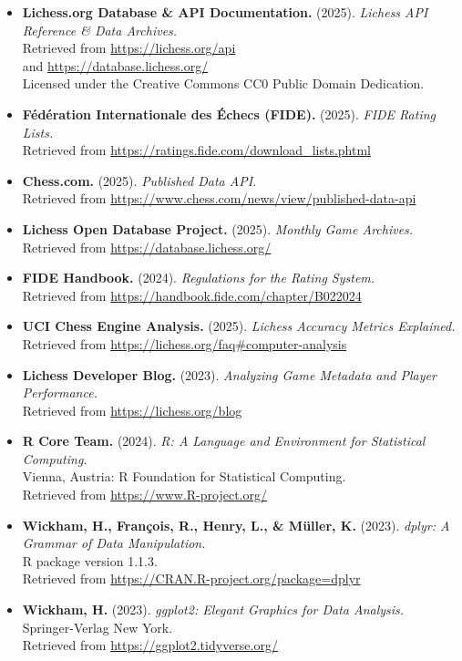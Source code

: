 \documentclass[
]{article}
\begin{document}
\begin{itemize}
\item
  \textbf{Lichess.org Database \& API Documentation.} (2025).
  \emph{Lichess API Reference \& Data Archives.}\\
  Retrieved from \url{https://lichess.org/api}\\
  and \url{https://database.lichess.org/}\\
  Licensed under the Creative Commons CC0 Public Domain Dedication.
\item
  \textbf{Fédération Internationale des Échecs (FIDE).} (2025).
  \emph{FIDE Rating Lists.}\\
  Retrieved from \url{https://ratings.fide.com/download_lists.phtml}
\item
  \textbf{Chess.com.} (2025). \emph{Published Data API.}\\
  Retrieved from
  \url{https://www.chess.com/news/view/published-data-api}
\item
  \textbf{Lichess Open Database Project.} (2025). \emph{Monthly Game
  Archives.}\\
  Retrieved from \url{https://database.lichess.org/}
\item
  \textbf{FIDE Handbook.} (2024). \emph{Regulations for the Rating
  System.}\\
  Retrieved from \url{https://handbook.fide.com/chapter/B022024}
\item
  \textbf{UCI Chess Engine Analysis.} (2025). \emph{Lichess Accuracy
  Metrics Explained.}\\
  Retrieved from \url{https://lichess.org/faq\#computer-analysis}
\item
  \textbf{Lichess Developer Blog.} (2023). \emph{Analyzing Game Metadata
  and Player Performance.}\\
  Retrieved from \url{https://lichess.org/blog}
\item
  \textbf{R Core Team.} (2024). \emph{R: A Language and Environment for
  Statistical Computing.}\\
  Vienna, Austria: R Foundation for Statistical Computing.\\
  Retrieved from \url{https://www.R-project.org/}
\item
  \textbf{Wickham, H., François, R., Henry, L., \& Müller, K.} (2023).
  \emph{dplyr: A Grammar of Data Manipulation.}\\
  R package version 1.1.3.\\
  Retrieved from \url{https://CRAN.R-project.org/package=dplyr}
\item
  \textbf{Wickham, H.} (2023). \emph{ggplot2: Elegant Graphics for Data
  Analysis.}\\
  Springer-Verlag New York.\\
  Retrieved from \url{https://ggplot2.tidyverse.org/}
\end{itemize}
\end{document}
